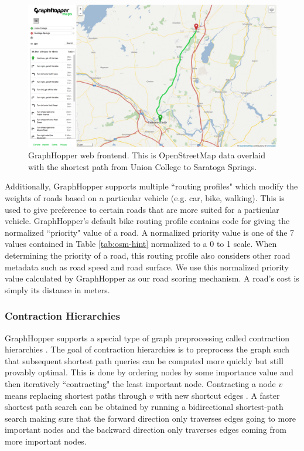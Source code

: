 \documentclass[honors]{union-cs-thesis}
\begin{document}
\begin{figure}
    \begin{center}
        \includegraphics[width=\textwidth]{figs/graphhopper}
    \end{center}
    \caption{GraphHopper web frontend. This is OpenStreetMap data overlaid with the shortest path from Union College to Saratoga Springs.}
    \label{tab:graphhopper-frontend}
\end{figure}

Additionally, GraphHopper supports multiple ``routing profiles" which modify the weights of roads based on a particular vehicle (e.g. car, bike, walking). This is used to give preference to certain roads that are more suited for a particular vehicle. GraphHopper's default bike routing profile contains code for giving the normalized ``priority" value of a road. A normalized priority value is one of the 7 values contained in Table \ref{tab:osm-hint} normalized to a 0 to 1 scale. When determining the priority of a road, this routing profile also considers other road metadata such as road speed and road surface. We use this normalized priority value calculated by GraphHopper as our road scoring mechanism. A road's cost is simply its distance in meters.


\subsubsection{Contraction Hierarchies}
GraphHopper supports a special type of graph preprocessing called contraction hierarchies \cite{graphhopper}. The goal of contraction hierarchies is to preprocess the graph such that subsequent shortest path queries can be computed more quickly but still provably optimal. This is done by ordering nodes by some importance value and then iteratively ``contracting" the least important node. Contracting a node $v$ means replacing shortest paths through $v$ with new shortcut edges \cite{geisberger2008contraction}. A faster shortest path search can be obtained by running a bidirectional shortest-path search making sure that the forward direction only traverses edges going to more important nodes and the backward direction only traverses edges coming from more important nodes.
\end{document}
